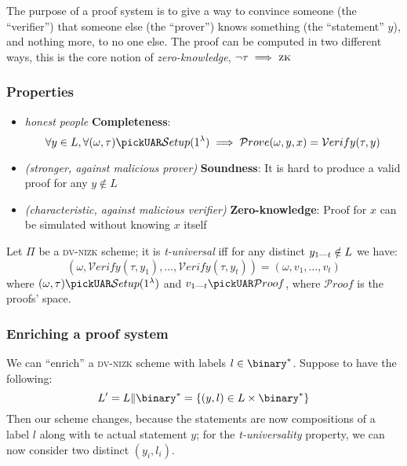 The purpose of a proof system is to give a way to convince someone (the ``verifier'') that someone else (the ``prover'') knows something (the ``statement'' $y$), and nothing more, to no one else. The proof can be computed in two different ways, this is the core notion of \emph{zero-knowledge}, $\neg \tau \implies \textsc{zk}$

\subsubsection{Properties}

\begin{itemize}
    \item \textit{honest people} \textbf{Completeness}:
    \[
        \forall y \in L, \forall (\omega, \tau) \pickUAR \mathcal{S}etup(1^\lambda) \implies \mathcal{P}rove(\omega, y, x) = \mathcal{V}erify(\tau, y)
    \]
    \item \textit{(stronger, against malicious prover)} \textbf{Soundness}: It is hard to produce a valid proof for any $y \notin L$
    \item \textit{(characteristic, against malicious verifier)} \textbf{Zero-knowledge}: Proof for $x$ can be simulated without knowing $x$ itself
\end{itemize}


\begin{definition}
    Let $\Pi$ be a \textsc{dv-nizk} scheme; it is \textit{t-universal} iff for any distinct $y_{1 \text{---} t} \notin L$ we have: 
    \[
        (\omega, \mathcal{V}erify(\tau, y_1), \ldots, \mathcal{V}erify(\tau, y_{t})) = (\omega, v_1, \ldots, v_t)
    \]
    where $(\omega, \tau) \pickUAR \mathcal{S}etup(1^\lambda)$ and $v_{1 \upto t} \pickUAR \mathcal{P}roof$, where $\mathcal{P}roof$ is the proofs' space.
\end{definition}

\subsubsection{Enriching a proof system}

We can ``enrich'' a \textsc{dv-nizk} scheme with labels $l \in \binary^*$. Suppose to have the following:
\[
    L' = L \| \binary^* = \{(y, l) \in L \times \binary^*\}
\]
Then our scheme changes, because the statements are now compositions of a label $l$ along with te actual statement $y$; for the \textit{t-universality} property, we can now consider two distinct $(y_i, l_i)$.

